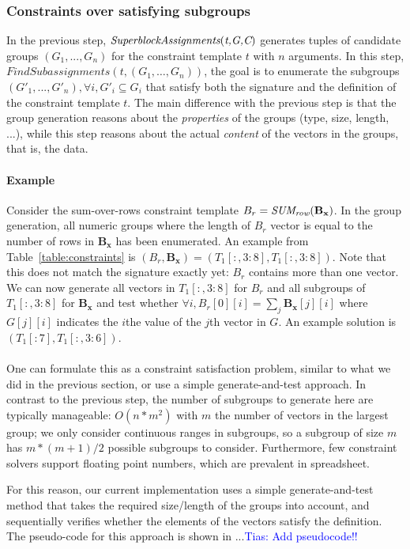\documentclass{IEEEtran}
\newcommand{\tias}[1]{\textcolor{blue}{{\sc Tias:} #1}\xspace}
\newcommand{\format}[1]{\textit{#1}\xspace}
\newcommand{\generategroups}{\format{SuperblockAssignments}}
\newcommand{\findassignment}{\format{FindSubassignments}}
\newcommand{\eccalc}[2]{\ensuremath{#1 = #2}}
\newcommand{\ecsumr}[2]{\eccalc{#1}{\textit{SUM\textsubscript{row}}(#2)}}
\newcommand{\sg}{B}
\theoremstyle{definition}
\begin{document}
\subsubsection{Constraints over satisfying subgroups} \label{sec:algo:subgr}
In the previous step, $\generategroups(\textit{t,{\cal G},C})$ generates tuples of candidate groups $(G_1, ..., G_n)$ for the constraint template $t$ with $n$ arguments. In this step, $\findassignment(t, (G_1, \dots, G_n))$, the goal is to enumerate the subgroups $(G'_1, ..., G'_n), \forall i, G'_i \subseteq G_i$ that satisfy both the signature and the definition of the constraint template $t$. The main difference with the previous step is that the group generation reasons about the \textit{properties} of the groups (type, size, length, ...), while this step reasons about the actual \textit{content} of the vectors in the groups, that is, the data.

\paragraph{Example}
Consider the sum-over-rows constraint template $\ecsumr{\sg_r}{\mathbf{\sg_x}}$. In the group generation, all numeric groups where the length of $\sg_r$ vector is equal to the number of rows in $\mathbf{\sg_x}$ has been enumerated. An example from Table~\ref{table:constraints} is $(\sg_r, \mathbf{\sg_x}) = (T_1[:,3:8],T_1[:,3:8])$. Note that this does not match the signature exactly yet: $\sg_r$ contains more than one vector. We can now generate all vectors in $T_1[:,3:8]$ for $\sg_r$ and all subgroups of $T_1[:,3:8]$ for $\mathbf{\sg_x}$ and test whether $\forall i, \sg_r[0][i] = \sum_j \mathbf{\sg_x}[j][i]$ where $G[j][i]$ indicates the $i$the value of the $j$th vector in $G$. An example solution is $(T_1[:7], T_1[:,3:6])$.
\\\\

One can formulate this as a constraint satisfaction problem, similar to what we did in the previous section, or use a simple generate-and-test approach. In contrast to the previous step, the number of subgroups to generate here are typically manageable: $O(n*m^2)$ with $m$ the number of vectors in the largest group; we only consider continuous ranges in subgroups, so a subgroup of size $m$ has $m*(m+1)/2$ possible subgroups to consider. Furthermore, few constraint solvers support floating point numbers, which are prevalent in spreadsheet.

For this reason, our current implementation uses a simple generate-and-test method that takes the required size/length of the groups into account, and sequentially verifies whether the elements of the vectors satisfy the definition. The pseudo-code for this approach is shown in ...\tias{Add pseudocode!!}
\end{document}
